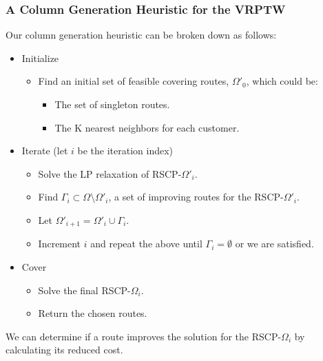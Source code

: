 \documentclass{beamer}
\begin{document}
	\begin{frame}[t]
		\frametitle{A Column Generation Heuristic for the VRPTW}
		\small
		\vspace{-.25cm}
		Our column generation heuristic can be broken down as follows:
		\begin{itemize}
			\item Initialize
			\begin{itemize}
				\item Find an initial set of feasible covering routes, $ \Omega'_0 $, which could be:
				\begin{itemize}
					\item The set of singleton routes.
					\item The K nearest neighbors for each customer.
				\end{itemize}
			\end{itemize}
			\item Iterate (let $ i $ be the iteration index)
			\begin{itemize}
				\item Solve the LP relaxation of RSCP-$ \Omega'_i $.
				\item Find $ \Gamma_i \subset \Omega \setminus \Omega'_i $, a set of improving routes for the RSCP-$ \Omega'_i $.
				\item Let $ \Omega'_{i+1} = \Omega'_i \cup \Gamma_i $.
				\item Increment $ i $ and repeat the above until $ \Gamma_i = \emptyset $ or we are satisfied.
			\end{itemize}
			\item Cover
			\begin{itemize}
				\item Solve the final RSCP-$ \Omega_i $.
				\item Return the chosen routes.
			\end{itemize}
		\end{itemize}
		\vspace{-.25cm}
		\begin{block}{}
			We can determine if a route improves the solution for the RSCP-$ \Omega_i $ by calculating its reduced cost.
		\end{block}
		\normalsize
	\end{frame}
\end{document}
